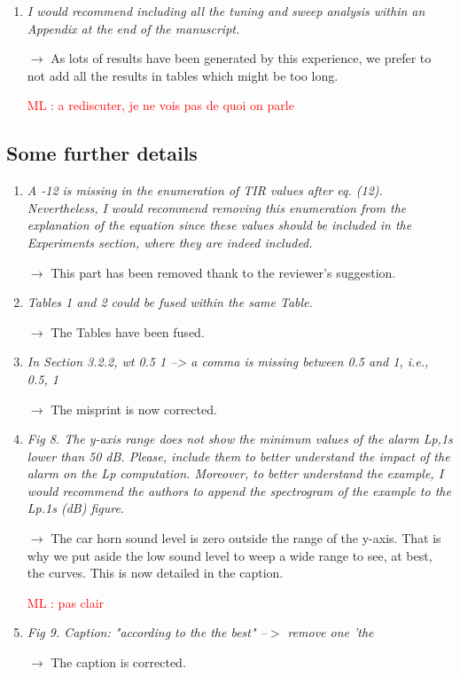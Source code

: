 \documentclass[10pt]{article}
\newcommand{\ml}[1]{\textcolor{red}{ML : #1}}
\begin{document}
\begin{enumerate}
\item \emph{I would recommend including all the tuning and sweep analysis within an Appendix at the end of the manuscript.}

$\rightarrow$ As lots of results have been generated by this experience, we prefer to not add all the results in tables which might be too long.

\ml{a rediscuter, je ne vois pas de quoi on parle}

\end{enumerate}

\subsection{Some further details}

\begin{enumerate}
\item \emph{A -12 is missing in the enumeration of TIR values after eq. (12). Nevertheless, I would recommend removing this enumeration from the explanation of the equation since these values should be included in the Experiments section, where they are indeed included.}

$\rightarrow$ This part has been removed thank to the reviewer's suggestion.

\item \emph{Tables 1 and 2 could be fused within the same Table.}

$\rightarrow$ The Tables have been fused.

\item \emph{In Section 3.2.2, wt {0.5 1} --> a comma is missing between 0.5 and 1, i.e., {0.5, 1} }

$\rightarrow$ The misprint is now corrected.

\item \emph{Fig 8. The y-axis range does not show the minimum values of the alarm Lp,1s lower than 50 dB. Please, include them to better understand the impact of the alarm on the Lp computation. Moreover, to better understand the example, I would recommend the authors to append the spectrogram of the example to the Lp.1s (dB) figure.}

$\rightarrow$ The car horn sound level is zero outside the range of the y-axis. That is why we put aside the low sound level to weep a wide range to see, at best, the curves. This is now detailed in the caption.

\ml{pas clair}

\item \emph{Fig 9. Caption: "according to the the best" --$>$ remove one 'the}

$\rightarrow$ The caption is corrected.

\end{enumerate}
\end{document}
